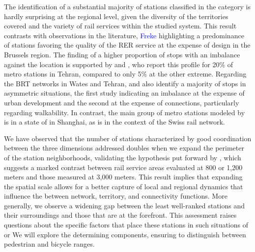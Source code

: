 \begin{refsegment}
The identification of a substantial majority of stations classified in the  category is hardly surprising at the regional level, given the diversity of the territories covered and the variety of rail services within the studied system. This result contrasts with observations in the literature, \textcolor{blue}{Freke} \textcolor{blue}{\textcite[46]{caset_planning_2019}} highlighting a predominance of  stations favoring the quality of the \acrfull{RER} service at the expense of design in the Brussels region. The finding of a higher proportion of stops with an imbalance against the location is supported by \textcolor{blue}{\textcite[190]{kutty_assessment_2018}} and \textcolor{blue}{\textcite[19]{monajem_evaluation_2015}}, who report this profile for 20\% of metro stations in Tehran, compared to only 5\% at the other extreme. Regarding the \acrfull{BRT} networks in Wates and Tehran, \textcolor{blue}{\textcite[15]{alfyan_node-place_2022}} and \textcolor{blue}{\textcite[13]{pezeshknejad_evaluating_2020}} also identify a majority of stops in asymmetric situations, the first study indicating an imbalance at the expense of urban development and the second at the expense of connections, particularly regarding walkability. In contrast, the main group of metro stations modeled by \textcolor{blue}{\textcite[12]{dou_integrating_2021}} is in a state of  in Shanghai, as is \textcolor{blue}{\textcite[197]{reusser_classifying_2008}} in the context of the Swiss rail network.%

We have observed that the number of stations characterized by good coordination between the three dimensions addressed doubles when we expand the perimeter of the station neighborhoods, validating the hypothesis put forward by \textcolor{blue}{\textcite[518]{caset_measuring_2018}}, which suggests a marked contrast between rail service areas evaluated at 800 or 1,200 meters and those measured at 3,000 meters. This result implies that expanding the spatial scale allows for a better capture of local and regional dynamics that influence the  between network, territory, and connectivity functions. More generally, we observe a widening gap between the least well-ranked stations and their surroundings and those that are at the forefront. This assessment raises questions about the specific factors that place these stations in such situations of  or  We will explore the determining components, ensuring to distinguish between pedestrian and bicycle ranges.%


\end{refsegment}
